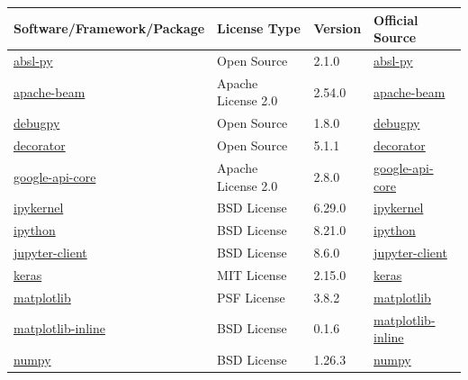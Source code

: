 \begin{table}[h!]
	\centering
	\begin{tabular}{|p{6cm}|p{3cm}|p{2.5cm}|p{4cm}|}
		\hline
		\rowcolor{lightgray} \textbf{Software/Framework/Package} & \textbf{License Type} & \textbf{Version} & \textbf{Official Source} \\
		\hline
		\href{https://pypi.org/project/absl-py/}{absl-py} & Open Source & 2.1.0 & \href{https://pypi.org/project/absl-py/}{absl-py} \\
		\hline
		\href{https://pypi.org/project/apache-beam/}{apache-beam} & Apache License 2.0 & 2.54.0 & \href{https://pypi.org/project/apache-beam/}{apache-beam} \\
		\hline
		\href{https://pypi.org/project/debugpy/}{debugpy} & Open Source & 1.8.0 & \href{https://pypi.org/project/debugpy/}{debugpy} \\
		\hline
		\href{https://pypi.org/project/decorator/}{decorator} & Open Source & 5.1.1 & \href{https://pypi.org/project/decorator/}{decorator} \\
		\hline
		\href{https://pypi.org/project/google-api-core/}{google-api-core} & Apache License 2.0 & 2.8.0 & \href{https://pypi.org/project/google-api-core/}{google-api-core} \\
		\hline
		\href{https://pypi.org/project/ipykernel/}{ipykernel} & BSD License & 6.29.0 & \href{https://pypi.org/project/ipykernel/}{ipykernel} \\
		\hline
		\href{https://pypi.org/project/ipython/}{ipython} & BSD License & 8.21.0 & \href{https://pypi.org/project/ipython/}{ipython} \\
		\hline
		\href{https://pypi.org/project/jupyter-client/}{jupyter-client} & BSD License & 8.6.0 & \href{https://pypi.org/project/jupyter-client/}{jupyter-client} \\
		\hline
		\href{https://pypi.org/project/keras/}{keras} & MIT License & 2.15.0 & \href{https://pypi.org/project/keras/}{keras} \\
		\hline
		\href{https://pypi.org/project/matplotlib/}{matplotlib} & PSF License & 3.8.2 & \href{https://pypi.org/project/matplotlib/}{matplotlib} \\
		\hline
		\href{https://pypi.org/project/matplotlib-inline/}{matplotlib-inline} & BSD License & 0.1.6 & \href{https://pypi.org/project/matplotlib-inline/}{matplotlib-inline} \\
		\hline
		\href{https://pypi.org/project/numpy/}{numpy} & BSD License & 1.26.3 & \href{https://pypi.org/project/numpy/}{numpy} \\

\end{tabular}
\end{table}
